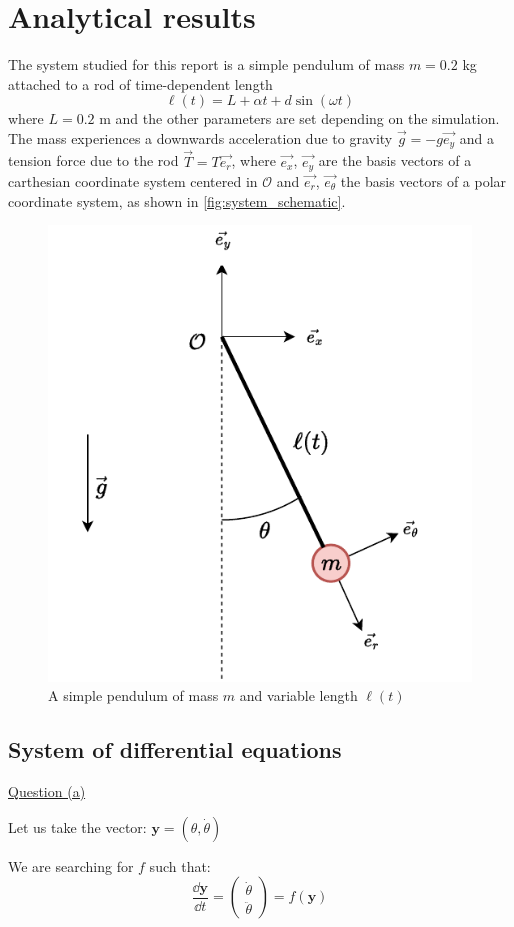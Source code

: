 \section{Analytical results}

The system studied for this report is a simple pendulum of mass \(m=0.2\) kg attached to a rod of time-dependent length
\begin{equation}
    \ell(t) = L + \alpha t + d \sin (\omega t)
\end{equation}
where \(L=0.2\) m and the other parameters are set depending on the simulation. The mass experiences a downwards acceleration due to gravity \(\vec{g}=-g \vec{e_y}\) and a tension force due to the rod \(\vec{T} = T \vec{e_r}\), where \(\vec{e_x}\), \(\vec{e_y}\) are the basis vectors of a carthesian coordinate system centered in \(\mathcal O\) and \(\vec{e_r}\), \(\vec{e_\theta}\) the basis vectors of a polar coordinate system, as shown in \autoref{fig:system_schematic}.

\begin{figure}[h]
    \centering
    \includegraphics[width=0.6\linewidth]{figures/system_schematic.pdf}
    \caption{A simple pendulum of mass \(m\) and variable length \(\ell(t)\)}
    \label{fig:system_schematic}
\end{figure}

\subsection{System of differential equations}
\underline{Question (a)}

Let us take the vector: $\textbf{y} = (\theta, \dot\theta)$

We are searching for $f$ such that:
\begin{equation}
    \frac{\dd \textbf{y}}{\dd t} = \left(\begin{matrix} \dot\theta \\ \ddot\theta \end{matrix}\right) = f(\textbf{y})
    \label{eq:a_question}
\end{equation}

